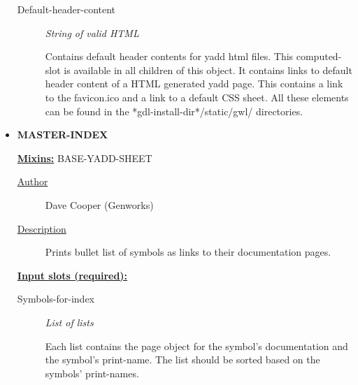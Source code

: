 \documentclass [11pt]{book}
\begin{document}
\begin{itemize}
\begin{description}
\item [Default-header-content]
\emph{String of valid HTML}

 Contains default header contents for yadd
html files.  This computed-slot is available in all children of this
object. It contains links to default header content of a HTML
generated yadd page. This contains a link to the favicon.ico and a
link to a default CSS sheet. All these elements can be found in the
*gdl-install-dir*/static/gwl/ directories.




\end{description}







\item {}
\textbf{MASTER-INDEX}


\textbf{
\underline{Mixins:}} BASE-YADD-SHEET





\begin{description}

\item [
\underline{Author}]


Dave Cooper (Genworks)



\item [
\underline{Description}]


Prints bullet list of symbols as links to their documentation pages.



\end{description}








\textbf{
\underline{Input slots (required):}}

\begin{description}

\item [Symbols-for-index]
\emph{List of lists}

 Each list contains the page object for the symbol's
documentation and the symbol's print-name. The list should be sorted
based on the symbols' print-names.




\end{description}







\end{itemize}
\end{document}
